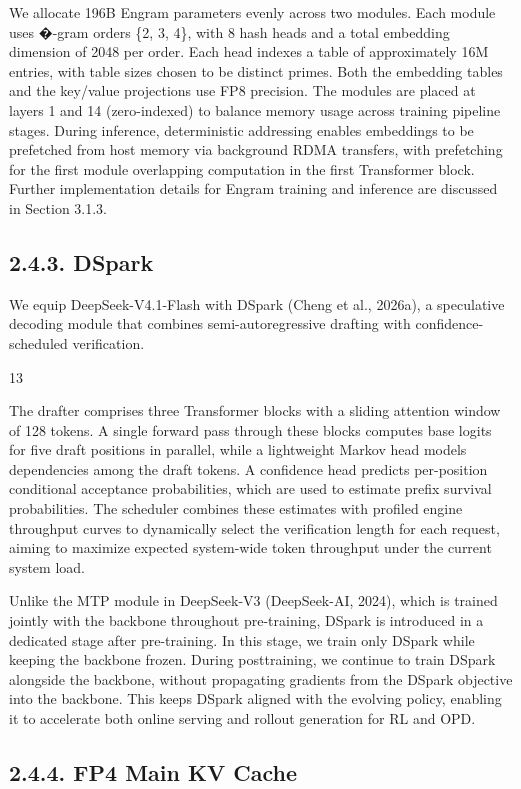 \documentclass[
  10
]{article}
\begin{document}
We allocate 196B Engram parameters evenly across two modules. Each
module uses �-gram orders \{2, 3, 4\}, with 8 hash heads and a total
embedding dimension of 2048 per order. Each head indexes a table of
approximately 16M entries, with table sizes chosen to be distinct
primes. Both the embedding tables and the key/value projections use FP8
precision. The modules are placed at layers 1 and 14 (zero-indexed) to
balance memory usage across training pipeline stages. During inference,
deterministic addressing enables embeddings to be prefetched from host
memory via background RDMA transfers, with prefetching for the first
module overlapping computation in the first Transformer block. Further
implementation details for Engram training and inference are discussed
in Section 3.1.3.

\subsection{2.4.3. DSpark}\label{dspark}

We equip DeepSeek-V4.1-Flash with DSpark (Cheng et al., 2026a), a
speculative decoding module that combines semi-autoregressive drafting
with confidence-scheduled verification.

13

The drafter comprises three Transformer blocks with a sliding attention
window of 128 tokens. A single forward pass through these blocks
computes base logits for five draft positions in parallel, while a
lightweight Markov head models dependencies among the draft tokens. A
confidence head predicts per-position conditional acceptance
probabilities, which are used to estimate prefix survival probabilities.
The scheduler combines these estimates with profiled engine throughput
curves to dynamically select the verification length for each request,
aiming to maximize expected system-wide token throughput under the
current system load.

Unlike the MTP module in DeepSeek-V3 (DeepSeek-AI, 2024), which is
trained jointly with the backbone throughout pre-training, DSpark is
introduced in a dedicated stage after pre-training. In this stage, we
train only DSpark while keeping the backbone frozen. During
posttraining, we continue to train DSpark alongside the backbone,
without propagating gradients from the DSpark objective into the
backbone. This keeps DSpark aligned with the evolving policy, enabling
it to accelerate both online serving and rollout generation for RL and
OPD.

\subsection{2.4.4. FP4 Main KV Cache}\label{fp4-main-kv-cache}
\end{document}
